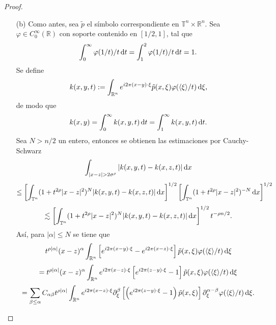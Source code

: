 \begin{proof}
\begin{itemize}
		\item[(b)] Como antes, sea $\tilde{p}$ el símbolo correspondiente en $\mathbb{T}^n \times \mathbb{R}^n$.  Sea $\varphi \in C_0^\infty(\mathbb{R})$ con soporte contenido en $[1/2, 1]$, tal que 
		\begin{equation*}
			\int_0^\infty\varphi(1/t)/t \mathop{}\!\mathrm{d} t =\int_1^2\varphi(1/t)/t \mathop{}\!\mathrm{d} t = 1.
		\end{equation*} 
		Se define 
		\begin{equation*}
			k(x, y, t) := \int_{\mathbb{R}^n} e^{i2\pi(x - y) \cdot \xi} \tilde{p}(x, \xi) \varphi(\langle\xi\rangle/t) \mathop{}\!\mathrm{d} \xi,
		\end{equation*}
		de modo que  
		\begin{equation*}
			k(x, y) = \int_0^\infty k(x, y, t) \mathop{}\!\mathrm{d} t = \int_1^\infty k(x, y, t) \mathop{}\!\mathrm{d} t.
		\end{equation*}
		Sea $N > n/2$ un entero, entonces se obtienen las estimaciones por Cauchy-Schwarz
		\begin{equation*}
			\int_{|x-z|>2\sigma^\rho} |k(x, y, t) - k(x, z, t)| \diff x
		\end{equation*}
		\begin{equation*}
			\leq  \left[ \int_{\mathbb{T}^n} (1+t^{2\rho}|x-z|^2)^N |k(x, y, t) - k(x, z, t)| \mathop{}\!\mathrm{d} x  \right]^{1/2} \left[ \int_{\mathbb{T}^n} (1+t^{2\rho}|x-z|^2)^{-N} \mathop{}\!\mathrm{d} x \right]^{1/2} 
		\end{equation*}
		\begin{equation}
			\lesssim \left[ \int_{\mathbb{T}^n} (1+t^{2\rho}|x-z|^2)^N |k(x, y, t) - k(x, z, t)| \mathop{}\!\mathrm{d} x  \right]^{1/2}t^{-\rho n/2}.
			\label{eq:primera-cota-b}
		\end{equation}
		Así, para $|\alpha| \leq N$ se tiene que
		\begin{equation*}
			t^{\rho|\alpha|}(x-z)^\alpha \int_{\mathbb{R}^n} \left[ e^{i2\pi(x - y) \cdot \xi} - e^{i2\pi(x - z) \cdot \xi} \right]\tilde{p}(x, \xi)\varphi(\langle\xi\rangle/t)\mathop{}\!\mathrm{d} \xi 
		\end{equation*}
		\begin{equation*}
			=t^{\rho|\alpha|}(x-z)^\alpha \int_{\mathbb{R}^n} e^{i2\pi(x - z) \cdot \xi} \left[ e^{i2\pi(z - y) \cdot \xi} - 1 \right]\tilde{p}(x, \xi)\varphi(\langle\xi\rangle/t)\mathop{}\!\mathrm{d} \xi 
		\end{equation*}
		\begin{equation*}
			=\sum_{\beta\leq\alpha} C_{\alpha\beta} t^{\rho|\alpha|} \int_{\mathbb{R}^n} e^{i2\pi(x - z) \cdot \xi} \partial^\beta_\xi \left[ 
			\left(e^{i2\pi(z - y) \cdot \xi} - 1 \right) \tilde{p}(x, \xi) \right] \partial^{\alpha-\beta}_\xi \varphi(\langle\xi\rangle/t)\diff \xi.

\end{equation*}
\end{itemize}
\end{proof}
